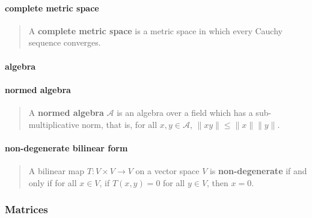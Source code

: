 \documentclass[letterpaper, 10pt]{article}
\theoremstyle{theostyle}
\begin{document}
\paragraph{complete metric space}
\begin{quote}
    A \textbf{complete metric space} is a metric space in which every Cauchy sequence converges.
\end{quote}

\paragraph{algebra}
\begin{quote}
\end{quote}

\paragraph{normed algebra}
\begin{quote}
    A \textbf{normed algebra} \(\mathcal{A}\) is an algebra over a field which has a sub-multiplicative norm,
    that is, for all \(x, y \in \mathcal{A}\), \(\lVert xy \rVert \leq \lVert x \rVert \lVert y \rVert\).
\end{quote}

\paragraph{non-degenerate bilinear form}
\begin{quote}
    A bilinear map \(T:V \times V \rightarrow V\) on a vector space \(V\) is \textbf{non-degenerate} 
    if and only if for all \(x \in V\), if \(T(x,y) = 0\) for all \(y \in V\), then \(x = 0\).
\end{quote}


\subsubsection{Matrices}
\end{document}
